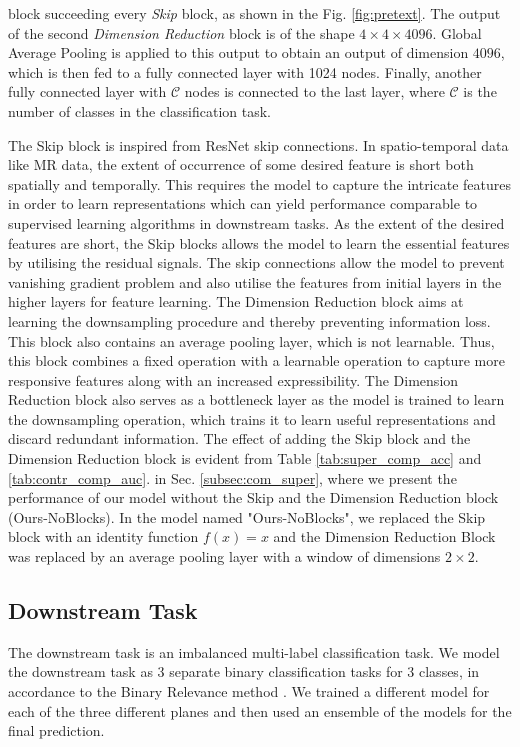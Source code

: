 \documentclass[journal]{IEEEtai}
\begin{document}
block succeeding every \textit{Skip} block, as shown in the Fig. \ref{fig:pretext}. The output of the second \textit{Dimension Reduction} block is of the shape $4 \times 4 \times 4096$. Global Average Pooling is applied to this output to obtain an output of dimension $4096$, which is then fed to a  fully connected layer with 1024 nodes. Finally, another fully connected layer with $\mathcal{C}$ nodes is connected to the last layer, where $\mathcal{C}$ is the number of classes in the classification task.


\indent The Skip block is inspired from ResNet \cite{resnet} skip connections. In spatio-temporal data like MR data, the extent of occurrence of some desired feature is short both spatially and temporally. This requires the model to capture the intricate features in order to learn representations which can yield performance comparable to supervised learning algorithms in downstream tasks. As the extent of the desired features are short, the Skip blocks allows the model to learn the essential features by utilising the residual signals. The skip connections allow the model to prevent vanishing gradient problem and also utilise the features from initial layers in the higher layers for feature learning. The Dimension Reduction block aims at learning the downsampling procedure and thereby preventing information loss. This block also contains an average pooling layer, which is not learnable. Thus, this block combines a fixed operation with a learnable operation to capture more responsive features along with an increased expressibility. The Dimension Reduction block also serves as a bottleneck layer as the model is trained to learn the downsampling operation, which trains it to learn useful representations and discard redundant information. The effect of adding the Skip block and the Dimension Reduction block is evident from Table \ref{tab:super_comp_acc} and \ref{tab:contr_comp_auc}. in Sec. \ref{subsec:com_super}, where we present the performance of our model without the Skip and the Dimension Reduction block (Ours-NoBlocks). In the model named "Ours-NoBlocks", we replaced the Skip block with an identity function $f(x) = x$ and the Dimension Reduction Block was replaced by an average pooling layer with a window of dimensions $2 \times 2$.

\subsection{Downstream Task}
\label{subsec:downstream}
\indent The downstream task is an imbalanced multi-label classification task. We model the downstream task as 3 separate binary classification tasks for 3 classes, in accordance to the Binary Relevance method \cite{Godbole2004DiscriminativeMF}. We trained a different model for each of the three different planes and then used an ensemble of the models for the final prediction. 
\end{document}
